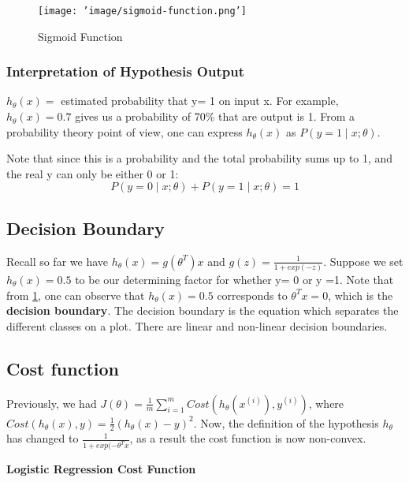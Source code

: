                \begin{figure}[htbp]
                    \centering
                    \texttt{[image: 'image/sigmoid-function.png']}
                    \caption{Sigmoid Function}
                    \label{fig:sigmoid-function}
                \end{figure}


        \subsubsection{Interpretation of Hypothesis Output}
        $ h_\theta (x)= $ estimated probability that y= 1 on input x. For example, $h_\theta(x)= 0.7$ gives us a probability of 70\% that are output is 1. 
        From a probability theory point of view, one can express $h_\theta (x)$ as $ P(y=1 \mid x;\theta)$. 

        Note that since this is a probability and the total probability sums up to 1, and the real y can only be either 0 or 1:
        \[
            P(y=0 \mid x; \theta) + P(y=1 \mid x;\theta) = 1
        \] 
            


    \subsection{Decision Boundary}

        Recall so far we have $h_\theta (x) = g(\theta^T) x$ and $g(z) = \frac{1}{1+exp(-z)}$. Suppose we set $h_\theta(x) = 0.5$ to be our determining factor for whether y= 0 or y =1. Note that from \ref{fig:sigmoid-function}, one can observe that $h_\theta(x) = 0.5$ corresponds to $\theta^T x = 0$, which is the \textbf{decision boundary}. The decision boundary is the equation which separates the different classes on a plot. There are linear and non-linear decision boundaries.


    \subsection{Cost function}

        Previously, we had $ J(\theta) = \frac{1}{m} \sum_{i=1}^{m} Cost( h_\theta ( x^{(i)}), y^{(i)} )$, where $Cost (h_\theta(x), y) = \frac{1}{2} (h_\theta(x) - y)^2$. 
        Now, the definition of the hypothesis $h_\theta$ has changed to $\frac{1}{1+exp(-\theta^T x}$, as a result the cost function is now non-convex. 
        
            \textbf{Logistic Regression Cost Function}

